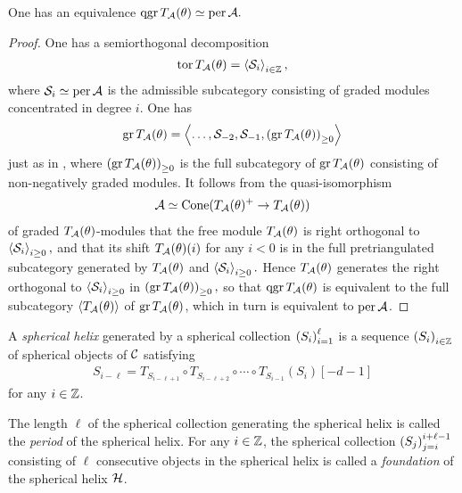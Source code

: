 \documentclass[a4paper,12pt]{amsart}
\begin{document}
\begin{proposition}
One has an equivalence
$
\operatorname{qgr} T_{\mathcal{A}}(\theta) \simeq \operatorname{per} \mathcal{A}.
$
\end{proposition}

\begin{proof}
One has a semiorthogonal decomposition
\begin{align}
  \operatorname{tor} T_{\mathcal{A}}(\theta)
  = \left\langle \mathcal{S}_i \right\rangle_{i \in \mathbb{Z}},
\end{align}
where $\mathcal{S}_i \simeq \operatorname{per} \mathcal{A}$ is the admissible subcategory
consisting of graded modules
concentrated in degree $i$.
One has
\begin{align}
  \operatorname{gr} T_{\mathcal{A}}(\theta)
   = \left\langle \ldots, \mathcal{S}_{-2}, \mathcal{S}_{-1},
    \left( \operatorname{gr} T_{\mathcal{A}}(\theta) \right)_{\ge 0} \right\rangle
\end{align}
just as in \cite[Lemma 14]{MR2641200},
where
$
\left( \operatorname{gr} T_{\mathcal{A}}(\theta) \right)_{\ge 0}
$
is the full subcategory of
$
\operatorname{gr} T_{\mathcal{A}}(\theta)
$
consisting of non-negatively graded modules.
It follows from the quasi-isomorphism
\begin{align}
  \mathcal{A} \simeq \operatorname{Cone}(T_{\mathcal{A}}(\theta)^+ \to T_{\mathcal{A}}(\theta))
\end{align}
of graded $T_{\mathcal{A}}(\theta)$-modules
that
the free module
$T_{\mathcal{A}}(\theta)$
is right orthogonal to
$
\left\langle \mathcal{S}_i \right\rangle_{i \ge 0},
$
and that its shift
$
T_{\mathcal{A}}(\theta)(i)
$
for any $i < 0$
is in the full pretriangulated subcategory
generated by $T_{\mathcal{A}}(\theta)$ and
$
\left\langle \mathcal{S}_i \right\rangle_{i \ge 0}.
$
Hence 
$T_{\mathcal{A}}(\theta)$
generates the right orthogonal to
$
\left\langle \mathcal{S}_i \right\rangle_{i \ge 0}
$
in
$
\left( \operatorname{gr} T_{\mathcal{A}}(\theta) \right)_{\ge 0},
$
so that 
$
\operatorname{qgr} T_{\mathcal{A}}(\theta)
$
is equivalent to the full subcategory
$
\left\langle T_{\mathcal{A}}(\theta) \right\rangle
$
of $\operatorname{gr} T_{\mathcal{A}}(\theta)$,
which in turn is equivalent to $\operatorname{per} \mathcal{A}$.
\end{proof}

\begin{definition}
A \emph{spherical helix}
generated by a spherical collection $\left( S_i \right)_{i=1}^\ell$
is a sequence $\left( S_i \right)_{i \in \mathbb{Z}}$
of spherical objects of $\mathcal{C}$
satisfying
\begin{align}
 S_{i-\ell}
  = T_{S_{i-\ell+1}} \circ T_{S_{i-\ell+2}}
   \circ \cdots \circ T_{S_{i-1}}(S_i)[ - d - 1 ]
\end{align}
for any $i \in \mathbb{Z}$.
\end{definition}

The length $\ell$ of the spherical collection
generating the spherical helix is called
the \emph{period} of the spherical helix.
For any $i \in \mathbb{Z}$,
the spherical collection $\left( S_j \right)_{j=i}^{i+\ell-1}$
consisting of $\ell$ consecutive objects in the spherical helix
is called a \emph{foundation}
of the spherical helix $\mathcal{H}$.
\end{document}
